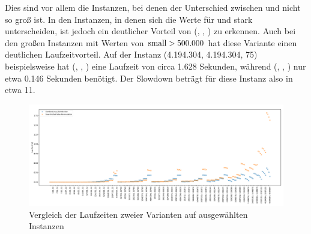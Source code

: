 Dies sind vor allem die Instanzen, bei denen der Unterschied zwischen \la{} und \sm{} nicht so groß ist.
In den Instanzen, in denen sich die Werte für \sm{} und \la{} stark unterscheiden, ist jedoch ein 
deutlicher Vorteil von (\SorSor, \true, \distr) zu erkennen. Auch bei den \glqq großen\grqq{} Instanzen
mit Werten von $\text{small{}}> 500.000$ hat diese Variante einen deutlichen Laufzeitvorteil.
Auf der Instanz (4.194.304, 4.194.304, 75) beispielsweise hat (\SeaUSet, \false, \perm) eine Laufzeit
von circa 1.628 Sekunden, während (\SorSor, \true, \distr) nur etwa 0.146 Sekunden benötigt. Der Slowdown
beträgt für diese Instanz also in etwa 11. 
\begin{figure}
\centering
	\includegraphics[width = \textwidth]{figures/small_aufsteigend.pdf}
	\caption{Vergleich der Laufzeiten zweier Varianten auf ausgewählten Instanzen}
	\label{fig:messung_small}
\end{figure}


